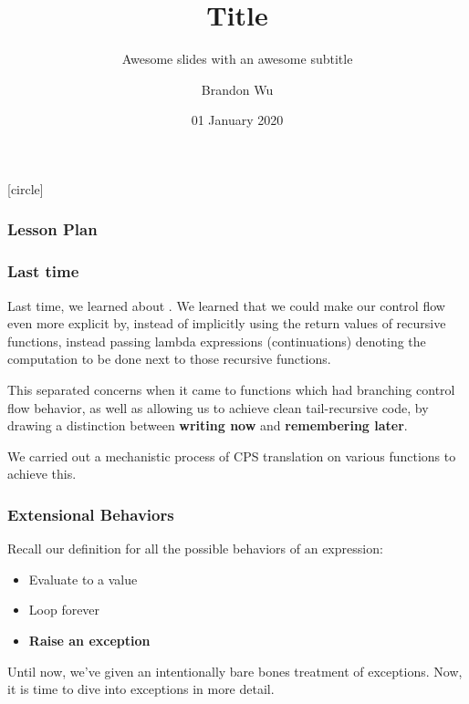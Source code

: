 \documentclass[aspectratio=169]{beamer}
\title{Title} %
\subtitle{Awesome slides with an awesome subtitle} %
\date{01 January 2020} %
\author{Brandon Wu} %
\newif\ifcolorlambda
\begin{document}
\ifweb
    \renewcommand{\pause}{}
\fi

[circle]

{
\begin{frame}[plain]
    \colorlambdatrue
    \titlepage
\end{frame}
}

\begin{frame}[fragile]
  \frametitle{Lesson Plan}

  \tableofcontents
\end{frame}

\begin{frame}[fragile]
  \frametitle{Last time}

  Last time, we learned about . We learned that
  we could make our control flow even more explicit by, instead of implicitly
  using the return values of recursive functions, instead passing lambda expressions
  (continuations) denoting the computation to be done next to those recursive functions.

  \vspace{\fill}

  This separated concerns when it came to functions which had branching control
  flow behavior, as well as allowing us to achieve clean tail-recursive code,
  by drawing a distinction between \textbf{writing now} and \textbf{remembering later}.

  \vspace{\fill}

  We carried out a mechanistic process of CPS translation on various functions to
  achieve this.
\end{frame}


\begin{frame}[fragile]
  \frametitle{Extensional Behaviors}

  Recall our definition for all the possible behaviors of an expression:
  \begin{itemize}
    \item Evaluate to a value
    \item Loop forever
    \item \textbf{Raise an exception}
  \end{itemize}

  \vspace{\fill}

  Until now, we've given an intentionally bare bones treatment of 
  exceptions. Now, it is time to dive into exceptions in more detail. 
\end{frame}
\end{document}
